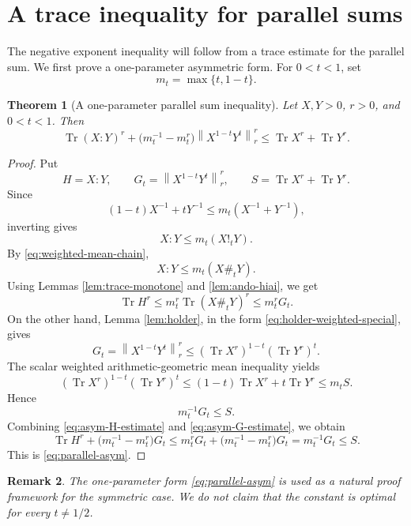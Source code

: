 \documentclass[11pt]{amsart}
\numberwithin{equation}{section}
\newtheorem{theorem}{Theorem}[section]
\newtheorem{remark}[theorem]{Remark}
\newcommand{\Tr}{\operatorname{Tr}}
\newcommand{\norm}[1]{\left\lVert #1\right\rVert}
\begin{document}
\section{A trace inequality for parallel sums}\label{sec:parallel}

The negative exponent inequality will follow from a trace estimate for the parallel sum.  We first prove a one-parameter asymmetric form.  For \(0<t<1\), set
\[
    m_t=\max\{t,1-t\}.
\]

\begin{theorem}[A one-parameter parallel sum inequality]\label{thm:parallel-asym}
Let \(X,Y>0\), \(r>0\), and \(0<t<1\).  Then
\begin{equation}\label{eq:parallel-asym}
    \Tr(X:Y)^r+
    \bigl(m_t^{-1}-m_t^r\bigr)\norm{X^{1-t}Y^t}_r^r
    \le
    \Tr X^r+\Tr Y^r .
\end{equation}
\end{theorem}

\begin{proof}
Put
\[
    H=X:Y,\qquad
    G_t=\norm{X^{1-t}Y^t}_r^r,\qquad
    S=\Tr X^r+\Tr Y^r.
\]
Since
\[
    (1-t)X^{-1}+tY^{-1}
    \le
    m_t(X^{-1}+Y^{-1}),
\]
inverting gives
\[
    X:Y\le m_t(X!_tY).
\]
By \eqref{eq:weighted-mean-chain},
\[
    X:Y\le m_t(X\#_tY).
\]
Using Lemmas \ref{lem:trace-monotone} and \ref{lem:ando-hiai}, we get
\begin{equation}\label{eq:asym-H-estimate}
    \Tr H^r
    \le
    m_t^r\Tr(X\#_tY)^r
    \le
    m_t^r G_t.
\end{equation}
On the other hand, Lemma \ref{lem:holder}, in the form \eqref{eq:holder-weighted-special}, gives
\begin{equation}\label{eq:asym-holder}
    G_t
    =
    \norm{X^{1-t}Y^t}_r^r
    \le
    (\Tr X^r)^{1-t}(\Tr Y^r)^t.
\end{equation}
The scalar weighted arithmetic-geometric mean inequality yields
\[
    (\Tr X^r)^{1-t}(\Tr Y^r)^t
    \le
    (1-t)\Tr X^r+t\Tr Y^r
    \le
    m_tS.
\]
Hence
\begin{equation}\label{eq:asym-G-estimate}
    m_t^{-1}G_t\le S.
\end{equation}
Combining \eqref{eq:asym-H-estimate} and \eqref{eq:asym-G-estimate}, we obtain
\[
    \Tr H^r+
    \bigl(m_t^{-1}-m_t^r\bigr)G_t
    \le
    m_t^rG_t+
    \bigl(m_t^{-1}-m_t^r\bigr)G_t
    =
    m_t^{-1}G_t
    \le S.
\]
This is \eqref{eq:parallel-asym}.
\end{proof}

\begin{remark}
The one-parameter form \eqref{eq:parallel-asym} is used as a natural proof framework for the symmetric case.  We do not claim that the constant is optimal for every \(t\ne 1/2\).
\end{remark}
\end{document}
